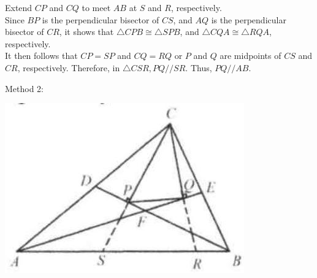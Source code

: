 \documentclass[10pt]{article}
\begin{document}
Extend \(C P\) and \(C Q\) to meet \(A B\) at \(S\) and \(R\), respectively.\\
Since \(B P\) is the perpendicular bisector of \(C S\), and \(A Q\) is the perpendicular bisector of \(C R\), it shows that \(\triangle C P B \cong \triangle S P B\), and \(\triangle C Q A \cong \triangle R Q A\), respectively.\\
It then follows that \(C P=S P\) and \(C Q=R Q\) or \(P\) and \(Q\) are midpoints of \(C S\) and \(C R\), respectively. Therefore, in \(\triangle C S R, P Q / / S R\). Thus, \(P Q / / A B\).

Method 2:
\begin{center}
\includegraphics[max width=\textwidth]{2025_04_17_97bc1f7e44d93c271a88g-059(3)}
\end{center}
\end{document}
